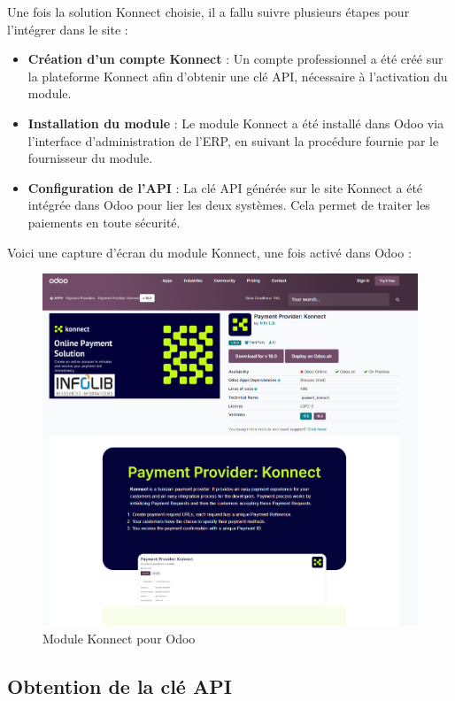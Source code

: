 \documentclass[12pt]{report}
\begin{document}
Une fois la solution Konnect choisie, il a fallu suivre plusieurs étapes pour l’intégrer dans le site :

\begin{itemize}
    \item \textbf{Création d'un compte Konnect} : Un compte professionnel a été créé sur la plateforme Konnect afin d'obtenir une clé API, nécessaire à l'activation du module.
    \item \textbf{Installation du module} : Le module Konnect a été installé dans Odoo via l'interface d'administration de l'ERP, en suivant la procédure fournie par le fournisseur du module.
    \item \textbf{Configuration de l'API} : La clé API générée sur le site Konnect a été intégrée dans Odoo pour lier les deux systèmes. Cela permet de traiter les paiements en toute sécurité.
\end{itemize}

Voici une capture d'écran du module Konnect, une fois activé dans Odoo :

\begin{figure}[H]
\centering
\includegraphics[width=1\textwidth]{images/Konnect Networks odoo module .PNG}
\caption{Module Konnect pour Odoo}
\end{figure}

\subsection{Obtention de la clé API}
\end{document}
